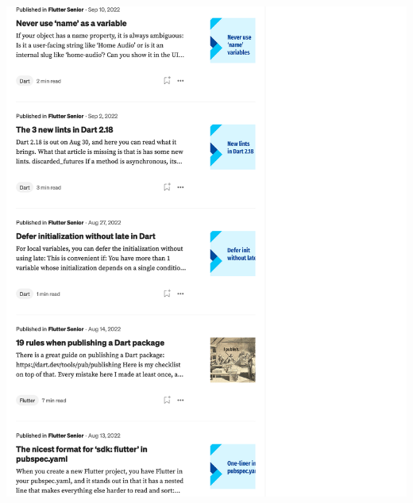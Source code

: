 \Continuing
\begin{center}
    \includegraphics[width=40em]{medium-articles-p8}
\end{center}
\WillContinue
\pagebreak


